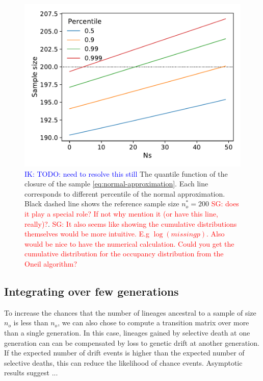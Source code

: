 \documentclass[review]{elsarticle}
\newcommand{\sgcomment}[1]{\textcolor{red}{SG: #1}}
\newcommand{\ikcomment}[1]{\textcolor{blue}{IK: #1}}
\begin{document}
\begin{figure}
  \centering
  \includegraphics[]{fig/quantile.pdf}
  \caption{\ikcomment{TODO: need to resolve this still} The quantile function of the closure of the
    sample \eqref{eq:normal-approximation}. Each line corresponds to different percentile of the
    normal approximation. Black dashed line shows the reference sample size $n_o^*=200$
    \sgcomment{does it play a special role? If not why mention it (or have this line, really)?}.
    \sgcomment{It also seems like showing the cumulative distributions themselves would be more
      intuitive. E.g $\log(missing p)$. Also would be nice to have the numerical calculation. Could
      you get the cumulative distribution for the occupancy distribution from the Oneil algorithm? }}
  \label{fig:normal-approximation}
\end{figure}

\subsection{Integrating over few generations} 
To increase the chances that the number of lineages ancestral to a sample 
of size $n_o$ is less than $n_o$, we can also chose to compute a transition matrix over more 
than a single generation. In this case, lineages gained by selective death at one generation can 
can be compensated by loss to genetic drift at another generation. If the expected number of 
drift events is higher than the expected number of selective deaths, this can reduce the likelihood 
of chance events. Asymptotic results suggest ... 
\end{document}
